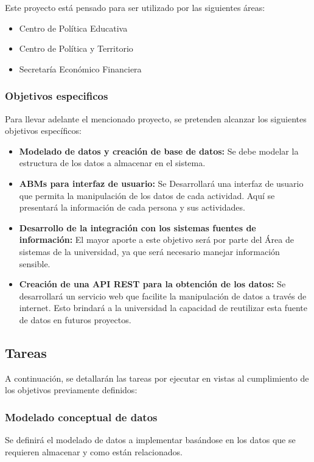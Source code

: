 \documentclass{article}
\begin{document}
Este proyecto está pensado para ser utilizado por las siguientes áreas:
\begin{itemize}
    \item Centro de Política Educativa
    \item Centro de Política y Territorio
    \item Secretaría Económico Financiera
\end{itemize}


\subsubsection{Objetivos especificos}%
\label{ssub:objetivos_especificos}

Para llevar adelante el mencionado proyecto, se pretenden alcanzar los siguientes objetivos específicos:

\begin{itemize}
    \item \textbf{Modelado de datos y creación de base de datos:} Se debe modelar la estructura de los datos a almacenar en el sistema.
    \item \textbf{ABMs para interfaz de usuario:} Se Desarrollará una interfaz de usuario que permita la manipulación de los
        datos de cada actividad\@. Aquí se presentará la información de cada persona y sus actividades.
    \item \textbf{Desarrollo de la integración con los sistemas fuentes de información:} El mayor aporte a este objetivo será
        por parte del Área de sistemas de la universidad, ya que será necesario manejar información sensible.
    \item \textbf{Creación de una API REST para la obtención de los datos:} Se desarrollará un servicio web que facilite la
        manipulación de datos a través de internet. Esto brindará a la universidad la capacidad de reutilizar esta fuente de datos en futuros proyectos.
\end{itemize}

\subsection{Tareas}%
\label{sub:tareas}
A continuación, se detallarán las tareas por ejecutar en vistas al cumplimiento de los objetivos previamente definidos:

\subsubsection{Modelado conceptual de datos}%
\label{ssub:modelado_conceptual_de_datos}
Se definirá el modelado de datos a implementar basándose en los datos que se requieren almacenar y como están relacionados.
\end{document}
